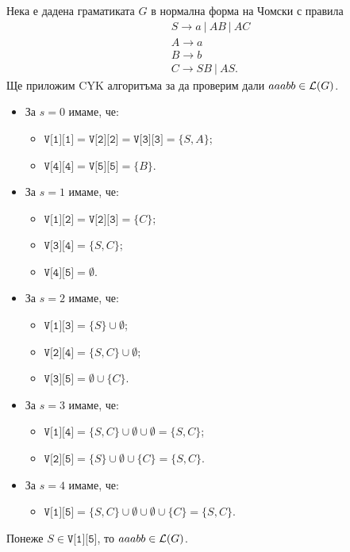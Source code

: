 {\scriptsize

\begin{multicols}{2}
  
\begin{example}
  Нека е дадена граматиката $G$ в нормална форма на Чомски с правила 
  \begin{align*}
    & S\rightarrow a\ |\ AB\ |\ AC\\
    & A\rightarrow a\\
    & B\rightarrow b\\
    & C\rightarrow SB\ |\ AS.
  \end{align*}
  Ще приложим CYK алгоритъма за да проверим дали $aaabb \in \mathcal{L}(G)$.
  
  \begin{itemize}
  \item 
    За $s = 0$ имаме, че:
    \begin{itemize}
    \item 
      $\texttt{V[1][1]} = \texttt{V[2][2]} = \texttt{V[3][3]} = \{S,A\}$;
    \item
      $\texttt{V[4][4]} = \texttt{V[5][5]} = \{B\}$.
    \end{itemize}
  \item
    За $s = 1$ имаме, че:
    \begin{itemize}
    \item
      $\texttt{V[1][2]} = \texttt{V[2][3]} = \{C\}$;
    \item
      $\texttt{V[3][4]} = \{S,C\}$;
    \item
      $\texttt{V[4][5]} = \emptyset$.
    \end{itemize}
  \item
    За $s = 2$ имаме, че:
    \begin{itemize}
    \item
      $\texttt{V[1][3]} = \{S\} \cup \emptyset$;
    \item
      $\texttt{V[2][4]} = \{S,C\} \cup \emptyset$;
    \item
      $\texttt{V[3][5]} = \emptyset \cup \{C\}$.
    \end{itemize}
  \item
    За $s = 3$ имаме, че:
    \begin{itemize}
    \item
      $\texttt{V[1][4]} = \{S,C\} \cup \emptyset \cup \emptyset = \{S,C\}$;
    \item
      $\texttt{V[2][5]} = \{S\} \cup \emptyset \cup \{C\} = \{S,C\}$.
    \end{itemize}
  \item
    За $s = 4$ имаме, че:
    \begin{itemize}
    \item 
      $\texttt{V[1][5]} = \{S,C\} \cup \emptyset \cup \emptyset \cup \{C\}= \{S,C\}$.
    \end{itemize}
  \end{itemize}
  Понеже $S \in \texttt{V[1][5]}$, то $aaabb \in \mathcal{L}(G)$.
\end{example}
\end{multicols}

}

